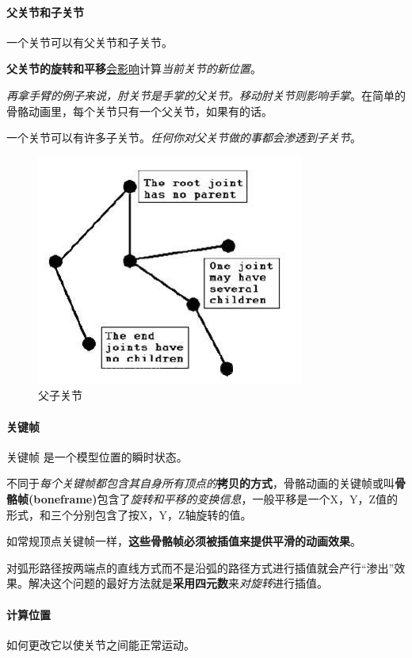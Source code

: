 \documentclass[UTF8,a4paper,12pt]{ctexbook}
\begin{document}
			\paragraph{父关节和子关节}
				一个关节可以有父关节和子关节。
				
				\textbf{父关节的旋转和平移}\underline{会影响}计算\textit{当前关节的新位置}。
				
				\textit{再拿手臂的例子来说，肘关节是手掌的父关节。移动肘关节则影响手掌}。在简单的骨骼动画里，每个关节只有一个父关节，如果有的话。
			
				一个关节可以有许多子关节。\textit{任何你对父关节做的事都会渗透到子关节}。
				
					\begin{figure}[H]
						\centering
						\includegraphics[width=.6\linewidth]{SkeletonTheory03}
						\caption{父子关节}
					\end{figure}				
				
			\paragraph{关键帧}
				关键帧 是一个模型位置的瞬时状态。
			
				不同于\textit{每个关键帧都包含其自身所有顶点的}\textbf{拷贝的方式}，骨骼动画的关键帧或叫\textbf{骨骼帧(boneframe)}包含了\textit{旋转和平移的变换信息}，一般平移是一个X，Y，Z值的形式，和三个分别包含了按X，Y，Z轴旋转的值。
				
				如常规顶点关键帧一样，\textbf{这些骨骼帧必须被插值来提供平滑的动画效果}。
				
				对弧形路径按两端点的直线方式而不是沿弧的路径方式进行插值就会产行“渗出”效果。解决这个问题的最好方法就是\textbf{采用四元数}来\textit{对旋转}进行插值。
				
			\paragraph{计算位置}
				如何更改它以使关节之间能正常运动。
				
\end{document}
